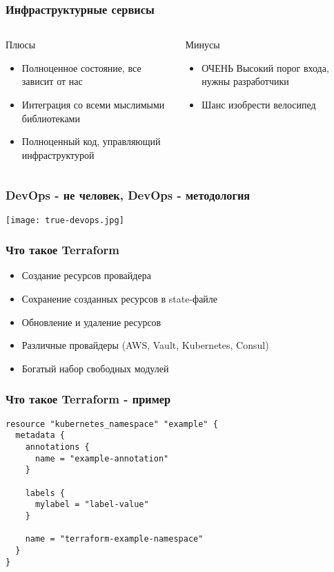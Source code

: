 \documentclass[mathserif,serif]{beamer}
\begin{document}
\begin{frame}
	\frametitle{Инфраструктурные сервисы}
	\begin{columns}[T]
		\begin{column}{.5\linewidth}
			\begin{minipage}[c][\textheight][c]{\linewidth}
          			Плюсы
				\begin{itemize}
					\item{Полноценное состояние, все зависит от нас}
					\item{Интеграция со всеми мыслимыми библиотеками}
					\item{Полноценный код, управляющий инфраструктурой}
				\end{itemize}
			\end{minipage}
		\end{column}
		\begin{column}{.5\linewidth}
			\begin{minipage}[c][\textheight][c]{\linewidth}
          			Минусы
				\begin{itemize}
					\item{ОЧЕНЬ Высокий порог входа, нужны разработчики}
					\item{Шанс изобрести велосипед}
				\end{itemize}
			\end{minipage}
		\end{column}
	\end{columns}
\end{frame}

\begin{frame}
	\frametitle{DevOps - не человек, DevOps - методология}
	\texttt{[image: true-devops.jpg]}
\end{frame}

\begin{frame}
	\frametitle{Что такое Terraform}
				\begin{itemize}
					\item{Создание ресурсов провайдера}
					\item{Сохранение созданных ресурсов в state-файле}
					\item{Обновление и удаление ресурсов}
					\item{Различные провайдеры (AWS, Vault, Kubernetes, Consul)}
					\item{Богатый набор свободных модулей}
				\end{itemize}
\end{frame}

\begin{frame}[fragile]
	\frametitle{Что такое Terraform - пример}
	\begin{verbatim}
resource "kubernetes_namespace" "example" {
  metadata {
    annotations {
      name = "example-annotation"
    }

    labels {
      mylabel = "label-value"
    }

    name = "terraform-example-namespace"
  }
}
	\end{verbatim}
\end{frame}
\end{document}
